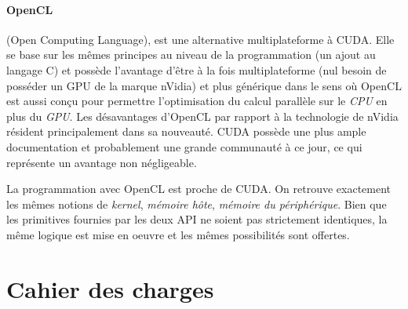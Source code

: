 			\paragraph{OpenCL}
				(Open Computing Language), est une alternative multiplateforme à CUDA. Elle se base sur les mêmes principes au niveau  de la programmation (un ajout au langage C) et possède l'avantage d'être à la fois multiplateforme (nul besoin de posséder un GPU de la marque nVidia) et plus générique dans le sens où OpenCL est aussi conçu pour permettre l'optimisation du calcul parallèle sur le \emph{CPU} en plus du \emph{GPU}. Les désavantages d'OpenCL par rapport à la technologie de nVidia résident principalement dans sa nouveauté. CUDA possède une plus ample documentation et probablement une grande communauté à ce jour, ce qui représente un avantage non négligeable.

				La programmation avec OpenCL est proche de CUDA. On retrouve exactement les mêmes notions de \emph{kernel}, \emph{mémoire hôte}, \emph{mémoire du périphérique}. Bien que les primitives fournies par les deux API ne soient pas strictement identiques, la même logique est mise en oeuvre et les mêmes possibilités sont offertes.

	\section{Cahier des charges}
